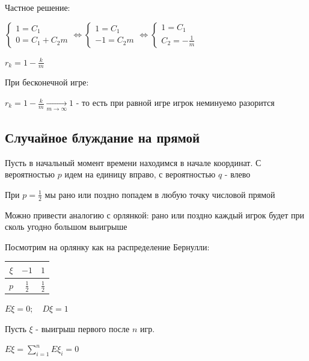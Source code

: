 \documentclass[12pt]{article}
\begin{document}
\begin{itemize}
        Частное решение: 
        
        $\begin{cases}
            1 = C_1 \\
            0 = C_1 + C_2 m
        \end{cases} \Longleftrightarrow \begin{cases}
            1 = C_1 \\
            -1 = C_2 m
        \end{cases} \Longleftrightarrow \begin{cases}
            1 = C_1 \\
            C_2 = -\frac{1}{m}
        \end{cases}$

        $r_k = 1 - \frac{k}{m}$

        При бесконечной игре:

        $r_k = 1 - \frac{k}{m} \underset{m \to \infty}{\longrightarrow} 1$ - то есть при равной игре игрок неминуемо разорится 

    \end{itemize}

    \subsection{Случайное блуждание на прямой}

    Пусть в начальный момент времени находимся в начале координат. С вероятностью $p$ идем на единицу вправо, с вероятностью $q$ - влево

    При $p = \frac{1}{2}$ мы рано или поздно попадем в любую точку числовой прямой

    Можно привести аналогию с орлянкой: рано или поздно каждый игрок будет при сколь угодно большом выигрыше

    Посмотрим на орлянку как на распределение Бернулли:

    \smallvspace

    \begin{tabular}{c|c|c}
        $\xi$ & $-1$        & $1$    \\
        \hline
        $p$   & $\frac{1}{2}$ & $\frac{1}{2}$
    \end{tabular}

    \smallvspace

    $E\xi = 0; \quad D\xi = 1$

    Пусть $\xi$ - выигрыш первого после $n$ игр.

    $E\xi = \sum_{i = 1}^n E\xi_i = 0$
\end{document}
